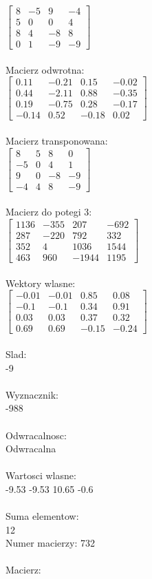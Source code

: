 \documentclass[a4paper,12pt]{article}
\begin{document}
$\begin{bmatrix} 8&-5&9&-4\\5&0&0&4\\8&4&-8&8\\0&1&-9&-9 \end{bmatrix}$
\\
\\
Macierz odwrotna:\\

$\begin{bmatrix} 0.11&-0.21&0.15&-0.02\\0.44&-2.11&0.88&-0.35\\0.19&-0.75&0.28&-0.17\\-0.14&0.52&-0.18&0.02 \end{bmatrix}$
\\
\\
Macierz transponowana:\\

$\begin{bmatrix} 8&5&8&0\\-5&0&4&1\\9&0&-8&-9\\-4&4&8&-9 \end{bmatrix}$
\\
\\
Macierz do potegi 3:\\

$\begin{bmatrix} 1136&-355&207&-692\\287&-220&792&332\\352&4&1036&1544\\463&960&-1944&1195 \end{bmatrix}$
\\
\\
Wektory wlasne:\\

$\begin{bmatrix} -0.01&-0.01&0.85&0.08\\-0.1&-0.1&0.34&0.91\\0.03&0.03&0.37&0.32\\0.69&0.69&-0.15&-0.24 \end{bmatrix}$
\\
\\
Slad:\\
-9
\\
\\
Wyznacznik:\\
-988
\\
\\
Odwracalnosc:\\
Odwracalna
\\
\\
Wartosci wlasne:\\
-9.53 -9.53 10.65 -0.6
\\
\\
Suma elementow:\\
12
\\
\newpage
Numer macierzy:
732
\\
\\
Macierz:\\
\end{document}
